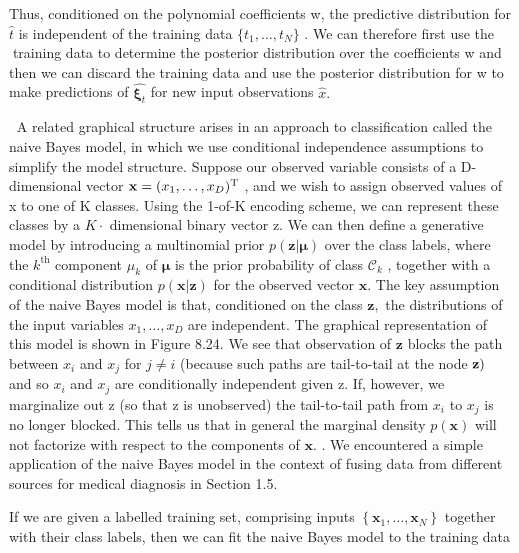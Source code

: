 \documentclass[
  10
]{article}
\begin{document}
Thus, conditioned on the polynomial coefficients w, the predictive
distribution for \(\widehat { t }\) is independent of the training data
\(\{ t _ { 1 } , \ldots , t _ { N } \}\) . We can therefore first use
the training data to determine the posterior distribution over the
coefficients w and then we can discard the training data and use the
posterior distribution for w to make predictions of
\(\widehat { \mathbf { \xi } _ { t } }\) for new input observations
\({ \widehat { x } } .\)

A related graphical structure arises in an approach to classification
called the naive Bayes model, in which we use conditional independence
assumptions to simplify the model structure. Suppose our observed
variable consists of a D-dimensional vector
\({ \bf x } = ( x _ { 1 } , \dots , x _ { D } ) ^ { \mathrm { T } }\) ,
and we wish to assign observed values of x to one of K classes. Using
the 1-of-K encoding scheme, we can represent these classes by a
\(K \cdot\) dimensional binary vector z. We can then define a generative
model by introducing a multinomial prior
\(p ( \mathbf { z } | \boldsymbol { \mu } )\) over the class labels,
where the \(k ^ { \mathrm { t h } }\) component \(\mu _ { k }\) of
\(\pmb { \mu }\) is the prior probability of class
\(\mathcal { C } _ { k }\) , together with a conditional distribution
\(p ( \mathbf { x } | \mathbf { z } )\) for the observed vector
\(\mathbf { x } .\) The key assumption of the naive Bayes model is that,
conditioned on the class \(\mathbf { z } ,\) the distributions of the
input variables \(x _ { 1 } , \ldots , x _ { D }\) are independent. The
graphical representation of this model is shown in Figure 8.24. We see
that observation of \(\mathbf { z }\) blocks the path between
\(x _ { i }\) and \(x _ { j }\) for \(j \neq i\) (because such paths are
tail-to-tail at the node \({ \bf z } )\) and so \(x _ { i }\) and
\(x _ { j }\) are conditionally independent given z. If, however, we
marginalize out z (so that z is unobserved) the tail-to-tail path from
\(x _ { i }\) to \(x _ { j }\) is no longer blocked. This tells us that
in general the marginal density \(p ( \mathbf { x } )\) will not
factorize with respect to the components of \(\mathbf { x } .\) . We
encountered a simple application of the naive Bayes model in the context
of fusing data from different sources for medical diagnosis in Section
1.5.

If we are given a labelled training set, comprising inputs
\(\left\{ \mathbf { x } _ { 1 } , \ldots , \mathbf { x } _ { N } \right\}\)
together with their class labels, then we can fit the naive Bayes model
to the training data
\end{document}
